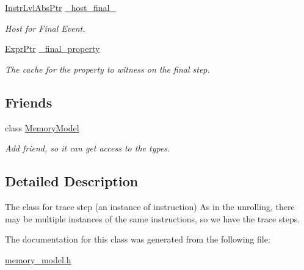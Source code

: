 \begin{DoxyCompactItemize}
\mbox{\label{classilang_1_1_trace_step_adcbae4d23a60a028956a3f67a4c0035e}} 
\mbox{\hyperlink{namespaceilang_ad1b30fdf347e493b3937143da05d1a72}{Instr\+Lvl\+Abs\+Ptr}} \mbox{\hyperlink{classilang_1_1_trace_step_adcbae4d23a60a028956a3f67a4c0035e}{\+\_\+host\+\_\+final\+\_\+}}
\begin{DoxyCompactList}\small\item\em Host for Final Event. \end{DoxyCompactList}\item 
\mbox{\label{classilang_1_1_trace_step_a8b6aced2b295be8696329888373008c1}} 
\mbox{\hyperlink{namespaceilang_a7c4196c72e53ea4df4b7861af7bc3bce}{Expr\+Ptr}} \mbox{\hyperlink{classilang_1_1_trace_step_a8b6aced2b295be8696329888373008c1}{\+\_\+final\+\_\+property}}
\begin{DoxyCompactList}\small\item\em The cache for the property to witness on the final step. \end{DoxyCompactList}\end{DoxyCompactItemize}
\subsection*{Friends}
\begin{DoxyCompactItemize}
\item 
\mbox{\label{classilang_1_1_trace_step_a2a502ee5bc6cd8e1f708dc4b77d85385}} 
class \mbox{\hyperlink{classilang_1_1_trace_step_a2a502ee5bc6cd8e1f708dc4b77d85385}{Memory\+Model}}
\begin{DoxyCompactList}\small\item\em Add friend, so it can get access to the types. \end{DoxyCompactList}\end{DoxyCompactItemize}


\subsection{Detailed Description}
The class for trace step (an instance of instruction) As in the unrolling, there may be multiple instances of the same instructions, so we have the trace steps. 

The documentation for this class was generated from the following file\+:\begin{DoxyCompactItemize}
\item 
\mbox{\hyperlink{memory__model_8h}{memory\+\_\+model.\+h}}\end{DoxyCompactItemize}
